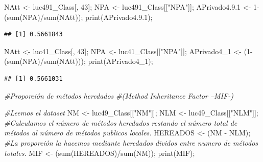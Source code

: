 \documentclass[
]{article}
\newenvironment{Shaded}{\begin{snugshade}}{\end{snugshade}}
\newcommand{\CommentTok}[1]{\textcolor[rgb]{0.56,0.35,0.01}{\textit{#1}}}
\newcommand{\DecValTok}[1]{\textcolor[rgb]{0.00,0.00,0.81}{#1}}
\newcommand{\FloatTok}[1]{\textcolor[rgb]{0.00,0.00,0.81}{#1}}
\newcommand{\FunctionTok}[1]{\textcolor[rgb]{0.00,0.00,0.00}{#1}}
\newcommand{\NormalTok}[1]{#1}
\newcommand{\OtherTok}[1]{\textcolor[rgb]{0.56,0.35,0.01}{#1}}
\newcommand{\SpecialCharTok}[1]{\textcolor[rgb]{0.00,0.00,0.00}{#1}}
\newcommand{\StringTok}[1]{\textcolor[rgb]{0.31,0.60,0.02}{#1}}
\begin{document}
\begin{Shaded}
\begin{Highlighting}[]
\NormalTok{NAtt }\OtherTok{\textless{}{-}}\NormalTok{ luc491\_Class[, }\DecValTok{43}\NormalTok{];}
\NormalTok{NPA }\OtherTok{\textless{}{-}}\NormalTok{ luc491\_Class[[}\StringTok{"NPA"}\NormalTok{]];}
\NormalTok{APrivado4.}\FloatTok{9.1} \OtherTok{\textless{}{-}} \DecValTok{1}\SpecialCharTok{{-}}\NormalTok{(}\FunctionTok{sum}\NormalTok{(NPA)}\SpecialCharTok{/}\FunctionTok{sum}\NormalTok{(NAtt));}
\FunctionTok{print}\NormalTok{(APrivado4.}\FloatTok{9.1}\NormalTok{);}
\end{Highlighting}
\end{Shaded}

\begin{verbatim}
## [1] 0.5661843
\end{verbatim}

\begin{Shaded}
\begin{Highlighting}[]
\NormalTok{NAtt }\OtherTok{\textless{}{-}}\NormalTok{ luc41\_Class[, }\DecValTok{43}\NormalTok{];}
\NormalTok{NPA }\OtherTok{\textless{}{-}}\NormalTok{ luc41\_Class[[}\StringTok{"NPA"}\NormalTok{]];}
\NormalTok{APrivado4\_1 }\OtherTok{\textless{}{-}}\NormalTok{ (}\DecValTok{1}\SpecialCharTok{{-}}\NormalTok{(}\FunctionTok{sum}\NormalTok{(NPA)}\SpecialCharTok{/}\FunctionTok{sum}\NormalTok{(NAtt)));}
\FunctionTok{print}\NormalTok{(APrivado4\_1);}
\end{Highlighting}
\end{Shaded}

\begin{verbatim}
## [1] 0.5661031
\end{verbatim}

\begin{Shaded}
\begin{Highlighting}[]
\CommentTok{\#Proporción de métodos heredados}
\CommentTok{\#(Method Inheritance Factor –MIF{-})}

\CommentTok{\#Leemos el dataset  }
\NormalTok{NM }\OtherTok{\textless{}{-}}\NormalTok{ luc49\_Class[[}\StringTok{"NM"}\NormalTok{]];}
\NormalTok{NLM }\OtherTok{\textless{}{-}}\NormalTok{ luc49\_Class[[}\StringTok{"NLM"}\NormalTok{]];}
\CommentTok{\#Calculamos el número de métodos heredados restando el número total de métodos al número de métodos publicos locales.}
\NormalTok{HEREADOS }\OtherTok{\textless{}{-}}\NormalTok{ (NM }\SpecialCharTok{{-}}\NormalTok{ NLM);}
\CommentTok{\#La proporción la hacemos mediante heredados dividos entre numero de métodos totales.}
\NormalTok{MIF }\OtherTok{\textless{}{-}}\NormalTok{ (}\FunctionTok{sum}\NormalTok{(HEREADOS)}\SpecialCharTok{/}\FunctionTok{sum}\NormalTok{(NM));}
\FunctionTok{print}\NormalTok{(MIF);}
\end{Highlighting}
\end{Shaded}
\end{document}
